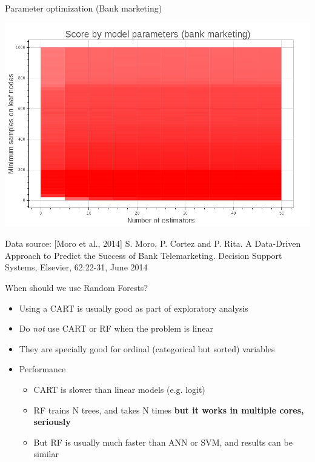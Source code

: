 \begin{frame}[fragile]{Parameter optimization (Bank marketing)}
    \begin{center}
        \includegraphics[scale=.22]{images/heatmap_nestim_minsamp_bankmkt}
    \end{center}
    \tiny{Data source: [Moro et al., 2014] S. Moro, P. Cortez and P. Rita.\newline{}
    A Data-Driven Approach to Predict the Success of Bank Telemarketing. Decision Support Systems, Elsevier, 62:22-31, June 2014}
\end{frame}

\begin{frame}[fragile]{When should we use Random Forests?}
    \begin{itemize}
        \item Using a CART is usually good as part of exploratory analysis
        \item Do \emph{not} use CART or RF when the problem is linear
        \item They are specially good for ordinal (categorical but sorted) variables
        \item Performance
        \begin{itemize}
            \item CART is slower than linear models (e.g. logit)
            \item RF trains N trees, and takes N times \textbf{but it works in multiple cores, seriously}
            \item But RF is usually much faster than ANN or SVM, and results can be similar
        \end{itemize}
    \end{itemize}

\end{frame}

